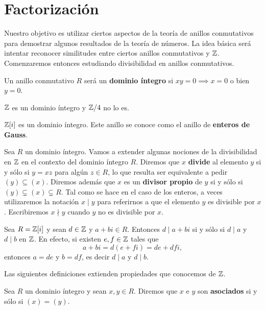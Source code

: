\chapter{Factorización}

Nuestro objetivo es utilizar ciertos aspectos de la teoría de anillos conmutativos para demostrar algunos resultados de la teoría de números. La idea básica será intentar reconocer similitudes entre
ciertos anillos conmutativos y $\mathbb{Z}$. Comenzaremos entonces 
estudiando divisibilidad en anillos conmutativos. 

\begin{definition}
Un anillo conmutativo $R$ será un \textbf{dominio íntegro} si $xy=0\implies x=0$ o bien $y=0$.
\end{definition}

\begin{example}
$\mathbb{Z}$ es un dominio íntegro y $\mathbb{Z}/4$ no lo es.
\end{example}

\begin{example}
$\mathbb{Z}[i]$ es un dominio íntegro. Este anillo se conoce como el anillo de \textbf{enteros de Gauss}.
\end{example}

Sea $R$ un dominio íntegro.
Vamos a extender algunas nociones de la divisibilidad en $\mathbb{Z}$ 
en el contexto del dominio íntegro $R$. Diremos que
$x$ \textbf{divide} al elemento $y$ si y sólo si $y=xz$ para algún $z\in R$, lo que resulta ser equivalente a pedir $(y)\subseteq (x)$. 
Diremos además que $x$ es un \textbf{divisor propio} de $y$ si y sólo si $(y)\subsetneq (x)\subsetneq R$. Tal como se hace en el caso
de los enteros, a veces utilizaremos la notación $x\mid y$ para referirnos a que el elemento $y$ es divisible por $x$. Escribiremos
$x\nmid y$ cuando $y$ no es divisible por $x$.

\begin{example}
\label{exa:Z[i]div}
Sea $R=\mathbb{Z}[i]$ y sean $d\in\mathbb{Z}$ y $a+bi\in R$. Entonces $d\mid a+bi$ si y sólo si $d\mid a$ y $d\mid b$ en $\mathbb{Z}$. 
En efecto, si existen $e,f\in\mathbb{Z}$ tales que 
\[
a+bi=d(e+fi)=de+dfi,
\] 	
entonces $a=de$ y $b=df$, es decir $d\mid a$ y $d\mid b$. 
\end{example}

Las siguientes definiciones extienden propiedades que conocemos de $\mathbb{Z}$.

\begin{definition}
Sea $R$ un dominio íntegro y sean $x,y\in R$. Diremos que 	
$x$ e $y$ son \textbf{asociados} si y sólo si $(x)=(y)$.
\end{definition}

